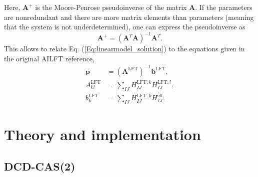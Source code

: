 Here, ${{\mathbf{A}}^ + }$ is the Moore-Penrose pseudoinverse of the matrix $\mathbf{A}$. If the parameters are nonredundant and there are more matrix elements than parameters (meaning that the system is not underdetermined), one can express the pseudoinverse as
\begin{equation}
{{\mathbf{A}}^ + } = {({{\mathbf{A}}^T}{\mathbf{A}})^{ - 1}}{{\mathbf{A}}^T}.
\end{equation}
This allows to relate Eq. (\ref{Eq:linearmodel_solution}) to the equations given in the original AILFT reference,\cite{AtanaGSN_2012_149}
\begin{align}
{\mathbf{p}} &= {({{\mathbf{A}}^{{\text{LFT}}}})^{ - 1}}{{\mathbf{b}}^{{\text{LFT}}}},\\
	A_{kl}^{{\text{LFT}}} &= \sum\limits_{IJ} {H_{IJ}^{{\text{LFT}},k}} H_{IJ}^{{\text{LFT}},l},\\
	b_k^{{\text{LFT}}} &= \sum\limits_{IJ} {H_{IJ}^{{\text{LFT}},k}} H_{IJ}^{{\text{eff}}}.
\end{align}

\chapter{Theory and implementation}
\section{DCD-CAS(2)}
